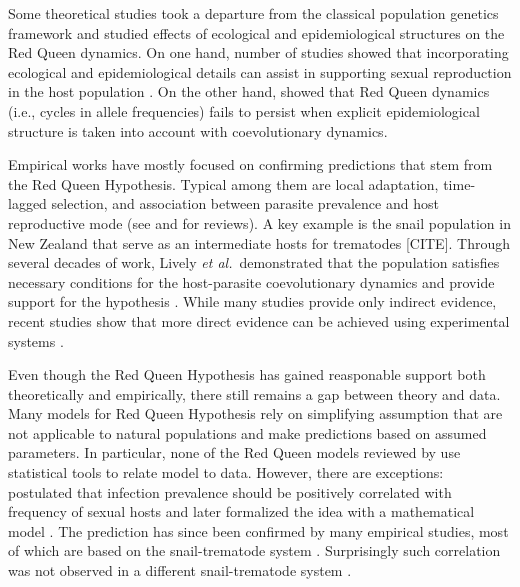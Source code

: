 \documentclass{article}\usepackage[]{graphicx}\usepackage[]{color}
\newcommand{\etal}{\textit{et al.}}
\begin{document}
Some theoretical studies took a departure from the classical population genetics framework and studied effects of ecological and epidemiological structures on the Red Queen dynamics.
On one hand, number of studies showed that incorporating ecological and epidemiological details can assist in supporting sexual reproduction in the host population \citep{galvani2001antigenic, galvani2003maintenance, lively2009maintenance, lively2010epidemiological}.
On the other hand, \cite{macpherson2017joint} showed that Red Queen dynamics (i.e., cycles in allele frequencies) fails to persist when explicit epidemiological structure is taken into account with coevolutionary dynamics.

Empirical works have mostly focused on confirming predictions that stem from the Red Queen Hypothesis.
Typical among them are local adaptation, time-lagged selection, and association between parasite prevalence and host reproductive mode (see \cite{tobler2008expanding} and \cite{vergara2014infection} for reviews).
A key example is the snail population in New Zealand that serve as an intermediate hosts for trematodes [CITE].
Through several decades of work, Lively \etal\ demonstrated that the population satisfies necessary conditions for the host-parasite coevolutionary dynamics and provide support for the hypothesis \citep{lively1987evidence, lively1989adaptation, dybdahl1995host, dybdahl1998host, jokela2009maintenance, vergara2014infection, gibson2016within}.
While many studies provide only indirect evidence, 
recent studies show that more direct evidence can be achieved using experimental systems \citep{auld2016sex, slowinski2016coevolutionary}.

Even though the Red Queen Hypothesis has gained reasponable support both theoretically and empirically, there still remains a gap between theory and data.
Many models for Red Queen Hypothesis rely on simplifying assumption that are not applicable to natural populations and make predictions based on assumed parameters.
In particular, none of the Red Queen models reviewed by \cite{ashby2015diversity} use statistical tools to relate model to data.
However, there are exceptions:
\cite{lively1992parthenogenesis} postulated that infection prevalence should be positively correlated with frequency of sexual hosts and later formalized the idea with a mathematical model \citep{lively2001trematode}.
The prediction has since been confirmed by many empirical studies, most of which are based on the snail-trematode system \citep{lively2002temporal, kumpulainen2004parasites, vergara2013geographic, mckone2016fine, gibson2016within}.
Surprisingly such correlation was not observed in a different snail-trematode system \citep{dagan2013clonal}.
\end{document}
